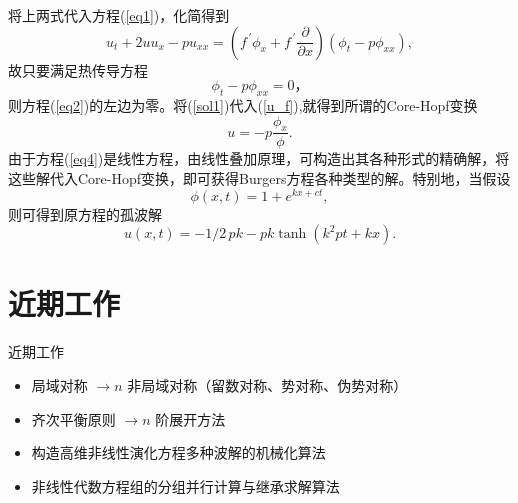 \documentclass{beamer}
\begin{document}
  \begin{frame}
  将上两式代入方程(\ref{eq1})，化简得到
  \begin{equation}\label{eq2}
  u_t+2uu_x-pu_{xx}=(f^{\,'}\phi_x+f^{\,'}\frac{\partial}{\partial x})(\phi_t-p\phi_{xx}),
  \end{equation}
  故只要满足热传导方程
  \begin{equation}\label{eq4}
    \phi_t-p\phi_{xx}=0，
  \end{equation}
    则方程(\ref{eq2})的左边为零。将(\ref{sol1})代入(\ref{u_f}),就得到所谓的Core-Hopf变换
  \[
    u=-p\dfrac{\phi_x}{\phi}.
  \]
  由于方程(\ref{eq4})是线性方程，由线性叠加原理，可构造出其各种形式的精确解，将这些解代入Core-Hopf变换，即可获得Burgers方程各种类型的解。特别地，当假设
  \[
    \phi(x,t)=1+e^{kx+ct} ,
  \]
  则可得到原方程的孤波解
  \[
    u \left( x,t \right) =-1/2\,pk-pk\tanh \left( {k}^{2}pt+kx \right).
  \]
  \end{frame}
  
\section{近期工作}
\begin{frame}{近期工作}
\begin{itemize}
  \item  局域对称 $\rightarrow n$ 非局域对称（留数对称、势对称、伪势对称）
  \item  齐次平衡原则 $\rightarrow n$ 阶展开方法
  \item  构造高维非线性演化方程多种波解的机械化算法 
  \item  非线性代数方程组的分组并行计算与继承求解算法
\end{itemize}
\end{frame}
\end{document}
